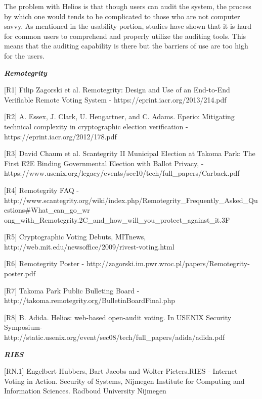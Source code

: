 The problem with Helios is that though users can audit the system, the process by which one would tends to be complicated to those who are not computer savvy. As mentioned in the usability portion, studies have shown that it is hard for common users to comprehend and properly utilize the auditing tools. This means that the auditing capability is there but the barriers of use are too high for the users.

\textbf{\textit{Remotegrity}}

[R1] Filip Zagorski et al. Remotegrity: Design and Use of an End-to-End Verifiable Remote Voting System - \textcolor[rgb]{0.078431375,0.3254902,0.6901961}{https://eprint.iacr.org/2013/214.pdf}

[R2] A. Essex, J. Clark, U. Hengartner, and C. Adams. Eperio: Mitigating technical complexity in cryptographic election verification - \textcolor[rgb]{0.078431375,0.3254902,0.6901961}{https://eprint.iacr.org/2012/178.pdf}

[R3] David Chaum et al. Scantegrity II Municipal Election at Takoma Park: The First E2E Binding Governmental Election with Ballot Privacy, - \textcolor[rgb]{0.078431375,0.3254902,0.6901961}{https://www.usenix.org/legacy/events/sec10/tech/full\_papers/Carback.pdf}

[R4] Remotegrity FAQ -\textcolor[rgb]{0.078431375,0.3254902,0.6901961}{http://www.scantegrity.org/wiki/index.php/Remotegrity\_Frequently\_Asked\_Questions\#What\_can\_go\_wr ong\_with\_Remotegrity.2C\_and\_how\_will\_you\_protect\_against\_it.3F}

[R5] Cryptographic Voting Debuts, MITnews, \textcolor[rgb]{0.078431375,0.3254902,0.6901961}{http://web.mit.edu/newsoffice/2009/rivest-voting.html}

[R6] Remotegrity Poster - \textcolor[rgb]{0.078431375,0.3254902,0.6901961}{http://zagorski.im.pwr.wroc.pl/papers/Remotegrity-poster.pdf}

[R7] Takoma Park Public Bulleting Board - \textcolor[rgb]{0.078431375,0.3254902,0.6901961}{http://takoma.remotegrity.org/BulletinBoardFinal.php}

[R8] B. Adida. Helios: web-based open-audit voting. In USENIX Security Symposium-\textcolor[rgb]{0.078431375,0.3254902,0.6901961}{http://static.usenix.org/event/sec08/tech/full\_papers/adida/adida.pdf}

\textbf{\textit{RIES}}

[RN.1] Engelbert Hubbers, Bart Jacobs and Wolter Pieters.RIES - Internet Voting in Action. Security of Systems, Nijmegen Institute for Computing and Information Sciences. Radboud University Nijmegen

